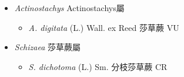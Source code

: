 
  \begin{itemize}
 \item[] \textit{Actinostachys} Actinostachys屬
                                
  \begin{itemize}
        \item[] \textit{A. digitata} (L.) Wall. ex Reed  莎草蕨   VU
  \end{itemize}
 \item[] \textit{Schizaea} 莎草蕨屬
                                
  \begin{itemize}
        \item[] \textit{S. dichotoma} (L.) Sm.  分枝莎草蕨   CR
  \end{itemize}
  \end{itemize}
